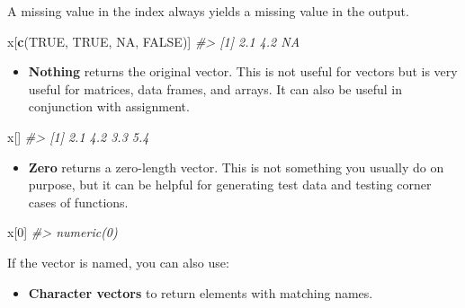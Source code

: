 \documentclass[]{book}
\newenvironment{Shaded}{\begin{snugshade}}{\end{snugshade}}
\newcommand{\CommentTok}[1]{\textcolor[rgb]{0.56,0.35,0.01}{\textit{#1}}}
\newcommand{\DecValTok}[1]{\textcolor[rgb]{0.00,0.00,0.81}{#1}}
\newcommand{\KeywordTok}[1]{\textcolor[rgb]{0.13,0.29,0.53}{\textbf{#1}}}
\newcommand{\NormalTok}[1]{#1}
\newcommand{\OtherTok}[1]{\textcolor[rgb]{0.56,0.35,0.01}{#1}}
\providecommand{\tightlist}{%
  \setlength{\itemsep}{0pt}\setlength{\parskip}{0pt}}
\theoremstyle{definition}
\theoremstyle{definition}
\theoremstyle{definition}
\theoremstyle{remark}
\begin{document}
A missing value in the index always yields a missing value in the
output.

\begin{Shaded}
\begin{Highlighting}[]
\NormalTok{x[}\KeywordTok{c}\NormalTok{(}\OtherTok{TRUE}\NormalTok{, }\OtherTok{TRUE}\NormalTok{, }\OtherTok{NA}\NormalTok{, }\OtherTok{FALSE}\NormalTok{)]}
\CommentTok{#> [1] 2.1 4.2  NA}
\end{Highlighting}
\end{Shaded}

\begin{itemize}
\tightlist
\item
  \textbf{Nothing} returns the original vector. This is not useful for
  vectors but is very useful for matrices, data frames, and arrays. It
  can also be useful in conjunction with assignment.
\end{itemize}

\begin{Shaded}
\begin{Highlighting}[]
\NormalTok{x[]}
\CommentTok{#> [1] 2.1 4.2 3.3 5.4}
\end{Highlighting}
\end{Shaded}

\begin{itemize}
\tightlist
\item
  \textbf{Zero} returns a zero-length vector. This is not something you
  usually do on purpose, but it can be helpful for generating test data
  and testing corner cases of functions.
\end{itemize}

\begin{Shaded}
\begin{Highlighting}[]
\NormalTok{x[}\DecValTok{0}\NormalTok{]}
\CommentTok{#> numeric(0)}
\end{Highlighting}
\end{Shaded}

If the vector is named, you can also use:

\begin{itemize}
\tightlist
\item
  \textbf{Character vectors} to return elements with matching names.
\end{itemize}
\end{document}
